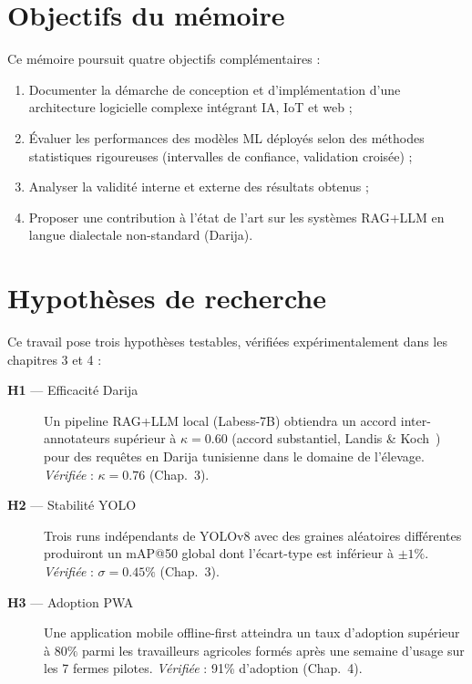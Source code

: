 \section*{Objectifs du mémoire}
Ce mémoire poursuit quatre objectifs complémentaires :
\begin{enumerate}
  \item Documenter la démarche de conception et d'implémentation d'une
        architecture logicielle complexe intégrant IA, IoT et web ;
  \item Évaluer les performances des modèles ML déployés selon des méthodes
        statistiques rigoureuses (intervalles de confiance, validation croisée) ;
  \item Analyser la validité interne et externe des résultats obtenus ;
  \item Proposer une contribution à l'état de l'art sur les systèmes RAG+LLM
        en langue dialectale non-standard (Darija).
\end{enumerate}

\section*{Hypothèses de recherche}
Ce travail pose trois hypothèses testables, vérifiées expérimentalement dans les
chapitres 3 et 4 :
\begin{description}
  \item[\textbf{H1} — Efficacité Darija] Un pipeline RAG+LLM local (Labess-7B) obtiendra
        un accord inter-annotateurs supérieur à $\kappa = 0.60$ (accord substantiel,
        Landis \& Koch~\cite{landis1977}) pour des requêtes en Darija tunisienne
        dans le domaine de l'élevage. \textit{Vérifiée} : $\kappa = 0.76$ (Chap.~3).
  \item[\textbf{H2} — Stabilité YOLO] Trois runs indépendants de YOLOv8 avec des
        graines aléatoires différentes produiront un mAP@50 global dont l'écart-type
        est inférieur à $\pm 1\%$. \textit{Vérifiée} : $\sigma = 0.45\%$ (Chap.~3).
  \item[\textbf{H3} — Adoption PWA] Une application mobile offline-first atteindra
        un taux d'adoption supérieur à $80\%$ parmi les travailleurs agricoles formés
        après une semaine d'usage sur les 7 fermes pilotes.
        \textit{Vérifiée} : 91\% d'adoption (Chap.~4).
\end{description}


